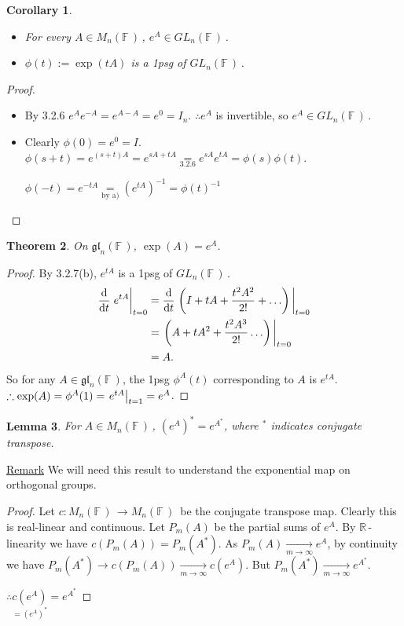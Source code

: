 \documentclass[12pt,a4paper]{article}
\newcommand{\rR}{\ensuremath{\mathbb{R}\,}}
\newcommand{\fF}{\ensuremath{\mathbb{F}\,}}
\newcommand{\mnf}{\ensuremath{M_n(\fF)\,}}
\newcommand{\glnff}{\ensuremath{GL_n(\fF)\,}}
\newcommand{\lglnf}{\ensuremath{\mathfrak{gl}_n(\fF)}}
\newcommand{\ul}[1]{\underline{#1}}
\newtheorem{thm}{Theorem}[subsubsection]
\newtheorem{lemma}[thm]{Lemma}
\newtheorem{cor}[thm]{Corollary}
\begin{document}
\begin{cor}
\begin{itemize}
\item[a)] For every $A\in \mnf$, $e^A\in \glnff$.
\item[b)] $\phi(t):=\exp(tA)$ is a 1psg of $\glnff$.
\end{itemize}
\end{cor}
\begin{proof}
\begin{itemize}
\item[a)] By 3.2.6 $e^A e^{-A}=e^{A-A}=e^0=I_n$. $\therefore e^A$ is invertible, so $e^A\in \glnff$.
\item[b)] Clearly $\phi(0)=e^0=I$. $\phi(s+t)=e^{(s+t)A}=e^{sA+tA}\underset{3.2.6}{=}e^{sA}e^{tA}=\phi(s)\phi(t)$. 

$\phi(-t)=e^{-tA}\underset{\text{by a)}}{=}\left(e^{tA}\right)^{-1}=\phi(t)^{-1}$
\end{itemize}
\end{proof}

\begin{thm}
On \lglnf, $\exp(A)=e^A$.
\end{thm}
\begin{proof}
By 3.2.7(b), $e^{tA}$ is a 1psg of \glnff.
\begin{align*}
\dv{t}\eval{e^{tA}}_{t=0}&=\dv{t}\eval{\left(I+tA+\frac{t^2A^2}{2!}+\ldots\right)}_{t=0}\\
&=\eval{\left(A+tA^2+\frac{t^2A^3}{2!}\ldots\right)}_{t=0}\\
&=A.
\end{align*}
So for any $A\in \lglnf$, the 1psg $\phi^A(t)$ corresponding to $A$ is $e^{tA}$. $\therefore \exp(A)=\phi^A(1)=\eval{e^{tA}}_{t=1}=e^A$.
\end{proof}
\begin{lemma}
For $A\in\mnf$, $\left(e^A\right)^*=e^{A^*}$, where $^*$ indicates conjugate transpose.
\end{lemma}
\ul{Remark} We will need this result to understand the exponential map on orthogonal groups.
\begin{proof}
Let $c:\mnf \to \mnf$ be the conjugate transpose map. Clearly this is real-linear and continuous. Let $P_m(A)$ be the partial sums of $e^A$. By \rR - linearity we have $c(P_m(A))=P_m(A^*)$. As $P_m(A)\underset{m\to \infty}{\to} e^A$, by continuity we have $P_m(A^*)\to c(P_m(A))\underset{m\to \infty}{\to} c(e^A) $. But $P_m(A^*)\underset{m\to \infty}{\to} e^{A^*}$. 

$\therefore \underset{=\left(e^{A}\right)^*}{c(e^A)}=e^{A^*}$
\end{proof}
\end{document}

